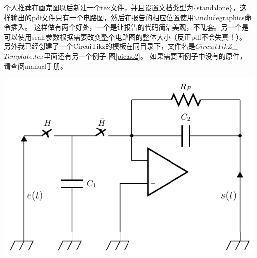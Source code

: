 \documentclass[12pt,a4paper,oneside]{book}
\begin{document}
{\par
个人推荐在画完图以后新建一个tex文件，并且设置文档类型为\{standalone\}，这样输出的pdf文件只有一个电路图，然后在报告的相应位置使用$\backslash$includegraphics命令插入。 这样做有两个好处，一个是让报告的代码简洁美观，不乱套。另一个是可以使用scale参数根据需要改变整个电路图的整体大小（反正pdf不会失真！）。另外我已经创建了一个CircuiTikz的模板在同目录下，文件名是$CircuitTikZ$\_$Template.tex$里面还有另一个例子 图\ref{pic:ao2}。 如果需要画例子中没有的原件，请查阅manuel手册。
\par
\begin{minipage}{\linewidth}
\makebox[\linewidth]{}
\centering
{}
\includegraphics[scale=1]{figures/ao2.pdf}
\label{pic:ao2}
\end{minipage}
\par

}
\end{document}
